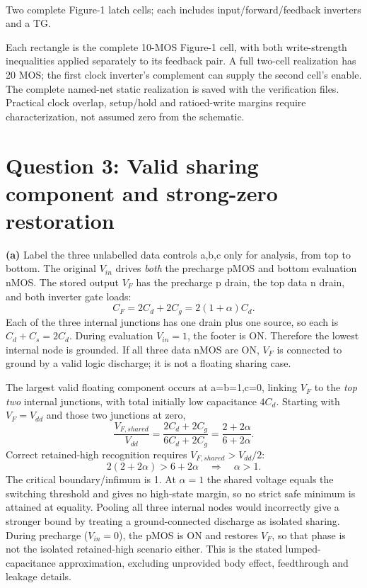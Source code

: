 \documentclass[10pt]{article}
\begin{document}
\begin{center}\\Two complete Figure-1 latch cells; each includes input/forward/feedback inverters and a TG.\end{center}
Each rectangle is the complete 10-MOS Figure-1 cell, with both write-strength inequalities applied separately to its feedback pair. A full two-cell realization has 20 MOS; the first clock inverter's complement can supply the second cell's enable. The complete named-net static realization is saved with the verification files. Practical clock overlap, setup/hold and ratioed-write margins require characterization, not assumed zero from the schematic.

\newpage\section*{Question 3: Valid sharing component and strong-zero restoration}
\textbf{(a)} Label the three unlabelled data controls a,b,c only for analysis, from top to bottom. The original $V_{in}$ drives \emph{both} the precharge pMOS and bottom evaluation nMOS. The stored output $V_F$ has the precharge p drain, the top data n drain, and both inverter gate loads:
\[C_F=2C_d+2C_g=2(1+\alpha)C_d.\]
Each of the three internal junctions has one drain plus one source, so each is $C_d+C_s=2C_d$. During evaluation $V_{in}=1$, the footer is ON. Therefore the lowest internal node is grounded. If all three data nMOS are ON, $V_F$ is connected to ground by a valid logic discharge; it is not a floating sharing case.

The largest valid floating component occurs at a=b=1,c=0, linking $V_F$ to the \emph{top two} internal junctions, with total initially low capacitance $4C_d$. Starting with $V_F=V_{dd}$ and those two junctions at zero,
\[\frac{V_{F,shared}}{V_{dd}}=\frac{2C_d+2C_g}{6C_d+2C_g}=\frac{2+2\alpha}{6+2\alpha}.\]
Correct retained-high recognition requires $V_{F,shared}>V_{dd}/2$:
\[2(2+2\alpha)>6+2\alpha\quad\Longrightarrow\quad\boxed{\alpha>1.}\]
The critical boundary/infimum is 1. At $\alpha=1$ the shared voltage equals the switching threshold and gives no high-state margin, so no strict safe minimum is attained at equality. Pooling all three internal nodes would incorrectly give a stronger bound by treating a ground-connected discharge as isolated sharing. During precharge ($V_{in}=0$), the pMOS is ON and restores $V_F$, so that phase is not the isolated retained-high scenario either. This is the stated lumped-capacitance approximation, excluding unprovided body effect, feedthrough and leakage details.
\end{document}
